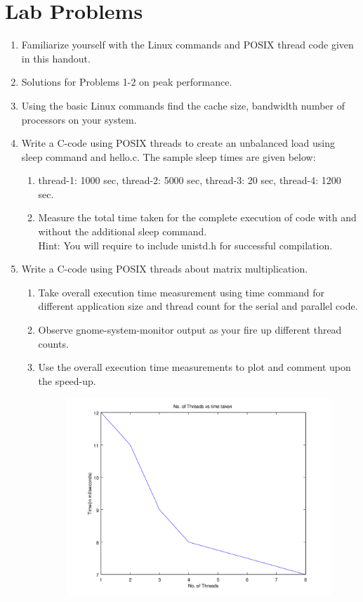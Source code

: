 \documentclass{sem5}
\begin{document}
\section*{Lab Problems}
\begin{enumerate}
\item Familiarize yourself with the Linux commands and POSIX thread code given in this handout.
\item Solutions for Problems 1-2 on peak performance.
\item Using the basic Linux commands find the cache size, bandwidth number of processors on your system.
\item Write a C-code using POSIX threads to create an unbalanced load using sleep command and hello.c. The sample sleep times are given below:
\begin{enumerate}
\item thread-1: 1000 sec, thread-2: 5000 sec, thread-3: 20 sec, thread-4: 1200 sec.
\item Measure the total time taken for the complete execution of code with and without the additional sleep command.\\
Hint: You will require to include unistd.h for successful compilation.
\end{enumerate}
\item Write a C-code using POSIX threads about matrix multiplication.
\begin{enumerate}
\item Take overall execution time measurement using time command for different application size and thread count for the serial and parallel code.
\item Observe gnome-system-monitor output as your fire up different thread counts.
\item Use the overall execution time measurements to plot and comment upon the speed-up.
\begin{figure}[!htp]
\centering
\includegraphics[scale=1]{result.png}
\end{figure}
\end{enumerate}
\end{enumerate}
\end{document}
